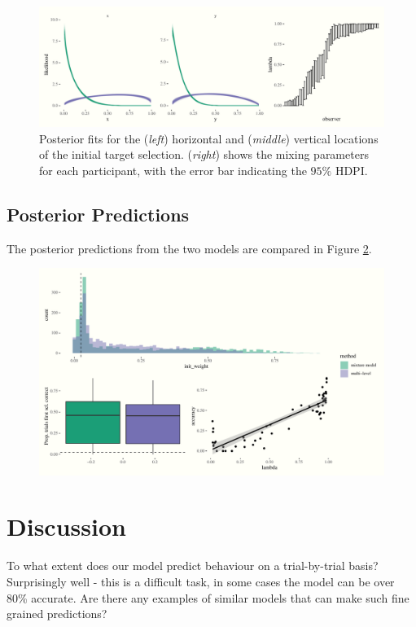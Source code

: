 \documentclass[vision,article,submit,pdftex,moreauthors]{Definitions/mdpi}
\begin{document}
\begin{figure}[H]
\centering
\includegraphics[width=12 cm]{Figures/init_sel2_mdl.pdf}
\caption{Posterior fits for the (\textit{left}) horizontal and (\textit{middle}) vertical locations of the initial target selection. (\textit{right}) shows the mixing parameters for each participant, with the error bar indicating the $95\%$  HDPI.}
\label{fig:qjep_init2_sel_mdl}
\end{figure} 


\subsection{Posterior Predictions}

The posterior predictions from the two models are compared in Figure \ref{fig:qjep_init_sel_pred}.

\begin{figure}[H]
\centering
\includegraphics[width=12 cm]{Figures/qjep_init_sel_preds.pdf}
\caption{}
\label{fig:qjep_init_sel_pred}
\end{figure} 


\section{Discussion}

To what extent does our model predict behaviour on a trial-by-trial basis? Surprisingly well - this is a difficult task, in some cases the model can be over 80\% accurate. Are there any examples of similar models that can make such fine grained predictions?
\end{document}
